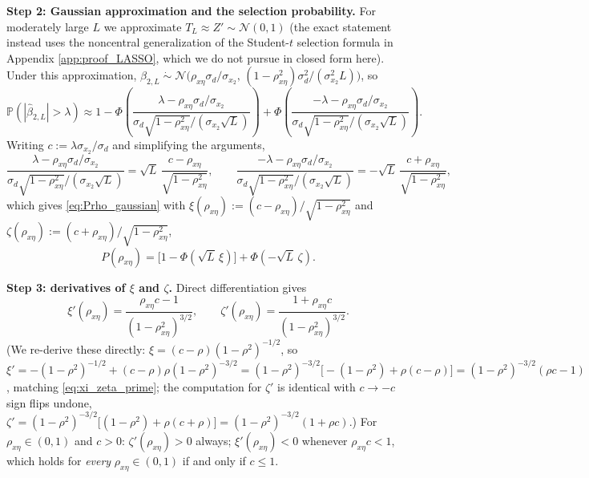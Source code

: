\textbf{Step 2: Gaussian approximation and the selection probability.} For moderately large $L$ we
approximate $T_L\approx Z'\sim\mathcal N(0,1)$ (the exact statement instead uses the noncentral
generalization of the Student-$t$ selection formula in Appendix \ref{app:proof_LASSO}, which we do not
pursue in closed form here). Under this approximation, $\hat\beta_{2,L}\;\dot\sim\;\mathcal
N\bigl(\rho_{x\eta}\sigma_d/\sigma_{x_2},\,(1-\rho_{x\eta}^2)\sigma_d^2/(\sigma_{x_2}^2L)\bigr)$, so
\[
\mathbb P(|\hat\beta_{2,L}|>\lambda) \approx 1-\Phi\!\left(\frac{\lambda-\rho_{x\eta}\sigma_d/\sigma_{x_2}}
{\sigma_d\sqrt{1-\rho_{x\eta}^2}/(\sigma_{x_2}\sqrt L)}\right) +
\Phi\!\left(\frac{-\lambda-\rho_{x\eta}\sigma_d/\sigma_{x_2}}{\sigma_d\sqrt{1-\rho_{x\eta}^2}/(\sigma_{x_2}
\sqrt L)}\right).
\]
Writing $c:=\lambda\sigma_{x_2}/\sigma_d$ and simplifying the arguments,
\[
\frac{\lambda-\rho_{x\eta}\sigma_d/\sigma_{x_2}}{\sigma_d\sqrt{1-\rho_{x\eta}^2}/(\sigma_{x_2}\sqrt L)}
=\sqrt L\,\frac{c-\rho_{x\eta}}{\sqrt{1-\rho_{x\eta}^2}}, \qquad
\frac{-\lambda-\rho_{x\eta}\sigma_d/\sigma_{x_2}}{\sigma_d\sqrt{1-\rho_{x\eta}^2}/(\sigma_{x_2}\sqrt L)}
=-\sqrt L\,\frac{c+\rho_{x\eta}}{\sqrt{1-\rho_{x\eta}^2}},
\]
which gives \eqref{eq:Prho_gaussian} with $\xi(\rho_{x\eta}):=(c-\rho_{x\eta})/\sqrt{1-\rho_{x\eta}^2}$
and $\zeta(\rho_{x\eta}):=(c+\rho_{x\eta})/\sqrt{1-\rho_{x\eta}^2}$,
\[
P(\rho_{x\eta}) = \bigl[1-\Phi(\sqrt L\,\xi)\bigr] + \Phi(-\sqrt L\,\zeta).
\]

\textbf{Step 3: derivatives of $\xi$ and $\zeta$.} Direct differentiation gives
\begin{equation}\label{eq:xi_zeta_prime}
\xi'(\rho_{x\eta}) = \frac{\rho_{x\eta} c-1}{(1-\rho_{x\eta}^2)^{3/2}}, \qquad
\zeta'(\rho_{x\eta}) = \frac{1+\rho_{x\eta} c}{(1-\rho_{x\eta}^2)^{3/2}}.
\end{equation}
(We re-derive these directly: $\xi=(c-\rho)(1-\rho^2)^{-1/2}$, so $\xi'=-(1-\rho^2)^{-1/2}+(c-\rho)\rho(1-
\rho^2)^{-3/2}=(1-\rho^2)^{-3/2}\bigl[-(1-\rho^2)+\rho(c-\rho)\bigr]=(1-\rho^2)^{-3/2}(\rho c-1)$, matching
\eqref{eq:xi_zeta_prime}; the computation for $\zeta'$ is identical with $c\to-c$ sign flips undone,
$\zeta'=(1-\rho^2)^{-3/2}\bigl[(1-\rho^2)+\rho(c+\rho)\bigr]=(1-\rho^2)^{-3/2}(1+\rho c)$.) For $\rho_{x\eta}
\in(0,1)$ and $c>0$: $\zeta'(\rho_{x\eta})>0$ always; $\xi'(\rho_{x\eta})<0$ whenever $\rho_{x\eta}c<1$,
which holds for \emph{every} $\rho_{x\eta}\in(0,1)$ if and only if $c\leq1$.

